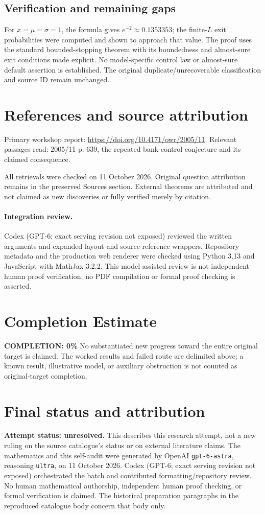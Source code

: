 \documentclass[11pt]{article}
\begin{document}
\subsection{Verification and remaining gaps}
For $x=\mu=\sigma=1$, the formula gives $e^{-2}\approx0.1353353$; the finite-$L$ exit probabilities were computed and shown to approach that value. The proof uses the standard bounded-stopping theorem with its boundedness and almost-sure exit conditions made explicit. No model-specific control law or almost-sure default assertion is established. The original duplicate/unrecoverable classification and source ID remain unchanged.

\section{References and source attribution}
Primary workshop report: \url{https://doi.org/10.4171/owr/2005/11}. Relevant passages read: 2005/11 p. 639, the repeated bank-control conjecture and its claimed consequence.

All retrievals were checked on 11 October 2026. Original question attribution remains in the preserved Sources section. External theorems are attributed and not claimed as new discoveries or fully verified merely by citation.


\paragraph{Integration review.} Codex (GPT-6; exact serving revision not exposed) reviewed the written arguments and expanded layout and source-reference wrappers. Repository metadata and the production web renderer were checked using Python 3.13 and JavaScript with MathJax 3.2.2. This model-assisted review is not independent human proof verification; no PDF compilation or formal proof checking is asserted.

\section{Completion Estimate}
\noindent\textbf{COMPLETION: 0\%}
No substantiated new progress toward the entire original target is claimed. The worked results and failed route are delimited above; a known result, illustrative model, or auxiliary obstruction is not counted as original-target completion.

\section{Final status and attribution}
\textbf{Attempt status: unresolved.} This describes this research attempt, not a new ruling on the source catalogue's status or on external literature claims.
The mathematics and this self-audit were generated by OpenAI \texttt{gpt-6-astra}, reasoning \texttt{ultra}, on 11 October 2026. Codex (GPT-6; exact serving revision not exposed) orchestrated the batch and contributed formatting/repository review. No human mathematical authorship, independent human proof checking, or formal verification is claimed. The historical preparation paragraphs in the reproduced catalogue body concern that body only.
\end{document}
